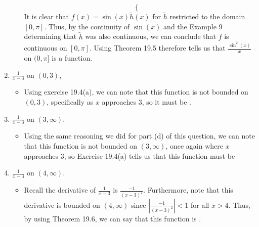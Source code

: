 \documentclass[10pt,a4paper]{article}
\theoremstyle{definition}
\begin{document}
\begin{enumerate}[label = (\alph*)]
\begin{itemize}
\[\begin{cases}
	\end{cases}
	\]
	It is clear that $f(x) = \sin(x)\tilde{h}(x)$ for $\tilde{h}$ restricted to the domain $[0,\pi]$. Thus, by the continuity of $\sin(x)$ and the Example 9 determining that $\tilde{h}$ was also continuous, we can conclude that $f$ is continuous on $[0,\pi]$. Using Theorem 19.5 therefore tells us that $\frac{\sin^2(x)}{x}$ on $(0, \pi]$ is a  function. 
	\end{itemize}
\item $\frac{1}{x - 3}$ on $(0,3)$,
	\begin{itemize}
	\item Using exercise 19.4(a), we can note that this function is not bounded on $(0,3)$, specifically as $x$ approaches 3, so it must be .
	\end{itemize}
\item $\frac{1}{x - 3}$ on $(3,\infty)$,
	\begin{itemize}
	\item Using the same reasoning we did for part (d) of this question, we can note that this function is not bounded on $(3, \infty)$, once again where $x$ approaches 3, so Exercise 19.4(a) tells us that this function must be \\
	\end{itemize}
\item $\frac{1}{x - 3}$ on $(4,\infty)$.
	\begin{itemize}
	\item Recall the derivative of $\frac{1}{x - 3}$ is $\frac{-1}{(x - 3)^2}$. Furthermore, note that this derivative is bounded on $(4, \infty)$ since $\left|\frac{-1}{(x - 3)^2}\right| < 1$ for all $x > 4$. Thus, by using Theorem 19.6, we can say that this function is .
	\end{itemize}
\end{enumerate}
\end{document}

